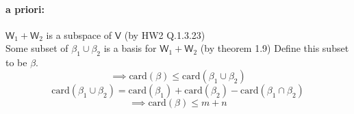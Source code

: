 \begin{enumerate}[(a)]
\paragraph{a priori:} $\mathsf{W}_1+\mathsf{W}_2$ is a subspace of $\mathsf{V}$
(by HW2 Q.1.3.23)
\\Some subset of $\beta_1\cup\beta_2$ is a basis for
$\mathsf{W}_1+\mathsf{W}_2$ (by theorem 1.9) Define this subset to be
$\beta$.
\begin{equation}
\implies \text{card}(\beta) \leq \text{card}(\beta_1\cup\beta_2)
\end{equation}
\begin{equation}
\text{card}(\beta_1\cup\beta_2) = \text{card}(\beta_1) +\text{card}(\beta_2)-\text{card}(\beta_1\cap\beta_2)
\end{equation}
\begin{equation}
\implies \text{card}(\beta) \leq m+n
\end{equation}
\end{enumerate}
